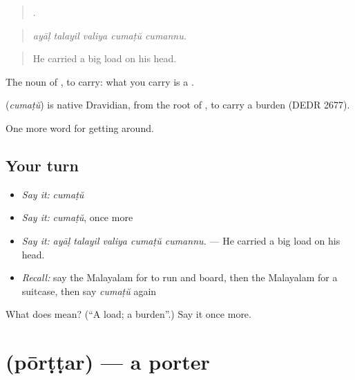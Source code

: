 \begin{quote}
    .
\end{quote}

\begin{quote}
\emph{ayāḷ talayil valiya cumaṭŭ cumannu.}
\end{quote}

\begin{quote}
He carried a big load on his head.
\end{quote}

The noun of , to carry: what you carry is a .

\begin{cousinweb}
\textbf{} (\emph{cumaṭŭ}) is native Dravidian, from the root of , to carry a burden (DEDR 2677).
\end{cousinweb}

\begin{grammarlens}[title={What you've built}]
One more word for getting around.
\end{grammarlens}

\subsection*{Your turn}
\begin{itemize}
\raggedright
  \item \emph{Say it:} \emph{cumaṭŭ}
  \item \emph{Say it:} \emph{cumaṭŭ}, once more
  \item \emph{Say it:} \emph{ayāḷ talayil valiya cumaṭŭ cumannu.} — He carried a big load on his head.
  \item \emph{Recall:} say the Malayalam for to run and board, then the Malayalam for a suitcase, then say \emph{cumaṭŭ} again
\end{itemize}

\begin{tcolorbox}[breakable,colback=teal!4,colframe=teal!35!black,title={Before you move on}]
What does  mean? (\textquotedblleft{}A load; a burden\textquotedblright{}.) Say it once more.
\end{tcolorbox}
\section[\texorpdfstring{\ml{പോർട്ടർ} (pōrṭṭar)}{പോർട്ടർ (pōrṭṭar)}]{ (pōrṭṭar) — a porter}

